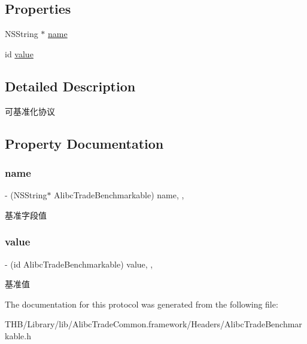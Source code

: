 \subsection*{Properties}
\begin{DoxyCompactItemize}
\item 
N\+S\+String $\ast$ \mbox{\hyperlink{protocol_alibc_trade_benchmarkable_01-p_a17d300e29861b00eff44d1bac2d4b15f}{name}}
\item 
id \mbox{\hyperlink{protocol_alibc_trade_benchmarkable_01-p_a29bd3c3ffff087706c89551aa0d97117}{value}}
\end{DoxyCompactItemize}


\subsection{Detailed Description}
可基准化协议 

\subsection{Property Documentation}
\mbox{\label{protocol_alibc_trade_benchmarkable_01-p_a17d300e29861b00eff44d1bac2d4b15f}} 
\subsubsection{\texorpdfstring{name}{name}}
{\footnotesize\ttfamily -\/ (N\+S\+String$\ast$ Alibc\+Trade\+Benchmarkable) name\hspace{0.3cm}{\ttfamily [read]}, {\ttfamily [nonatomic]}, {\ttfamily [strong]}}

基准字段值 \mbox{\label{protocol_alibc_trade_benchmarkable_01-p_a29bd3c3ffff087706c89551aa0d97117}} 
\subsubsection{\texorpdfstring{value}{value}}
{\footnotesize\ttfamily -\/ (id Alibc\+Trade\+Benchmarkable) value\hspace{0.3cm}{\ttfamily [read]}, {\ttfamily [nonatomic]}, {\ttfamily [strong]}}

基准值 

The documentation for this protocol was generated from the following file\+:\begin{DoxyCompactItemize}
\item 
T\+H\+B/\+Library/lib/\+Alibc\+Trade\+Common.\+framework/\+Headers/Alibc\+Trade\+Benchmarkable.\+h\end{DoxyCompactItemize}

